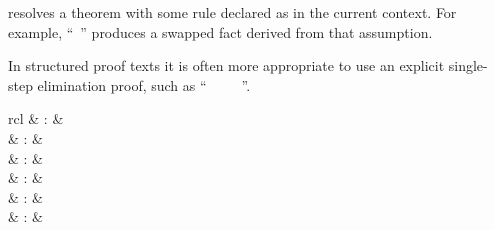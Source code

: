 \begin{isabellebody}
\begin{isamarkuptext}
\begin{description}
  \item \hyperlink{attribute.symmetric}{\mbox{}} resolves a theorem with some rule
  declared as \hyperlink{attribute.sym}{\mbox{}} in the current context.  For example,
  ``\hyperlink{command.assume}{\mbox{}}~'' produces a
  swapped fact derived from that assumption.

  In structured proof texts it is often more appropriate to use an
  explicit single-step elimination proof, such as ``\hyperlink{command.assume}{\mbox{}}~~\hyperlink{command.then}{\mbox{}}~\hyperlink{command.have}{\mbox{}}~~\hyperlink{command.ddot}{\mbox{\isa{\isacommand{{\isachardot}{\isachardot}}}}}''.

  \end{description}%
\end{isamarkuptext}%
\isamarkuptrue%
%
\isamarkuptrue%
%
\isamarkuptrue%
%
\begin{isamarkuptext}%
\begin{matharray}{rcl}
    \hypertarget{command.case}{\hyperlink{command.case}{\mbox{}}} & : &  \\
    \hypertarget{command.print-cases}{\hyperlink{command.print-cases}{\mbox{}}}\isa{{\isachardoublequote}\isactrlsup {\isacharasterisk}{\isachardoublequote}} & : &  \\
    \hypertarget{attribute.case-names}{\hyperlink{attribute.case-names}{\mbox{}}} & : &  \\
    \hypertarget{attribute.case-conclusion}{\hyperlink{attribute.case-conclusion}{\mbox{}}} & : &  \\
    \hypertarget{attribute.params}{\hyperlink{attribute.params}{\mbox{}}} & : &  \\
    \hypertarget{attribute.consumes}{\hyperlink{attribute.consumes}{\mbox{}}} & : &  \\
  \end{matharray}


\end{isamarkuptext}
\end{isabellebody}
